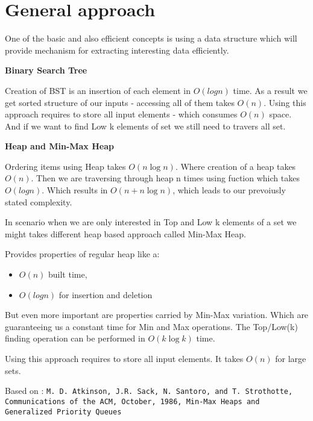 \section*{General approach}
One of the basic and also efficient concepts is using a data structure which
will provide mechanism for extracting interesting data efficiently. 

\noindent \textbf{Binary Search Tree}

Creation of BST is an insertion of each element in $O(log{}n)$ time. As a result 
we get sorted structure of our inputs - accessing all of them takes $O(n)$.
Using this approach requires to store all input elements - which consumes $O(n)$ space. 
And if we want to find Low k elements of set we still need to travers all set.

\noindent \textbf{Heap and Min-Max Heap}

Ordering items using Heap takes $O(n\log{}n)$. Where creation of a heap takes
$O(n)$. Then we are traversing through heap n times using fuction which takes
$O(log{}n)$. Which results in $O(n + n\log{}n)$, which leads to our prevoiusly
stated complexity.

In scenario when we are only interested in Top and Low k elements of a set we might takes
different heap based approach called Min-Max Heap.

Provides properties of regular heap like a: 
\begin{itemize}
\item $O(n)$ built time,
\item $O(log{}n)$ for insertion and deletion
\end{itemize}

But even more important are properties carried by Min-Max variation. Which are 
guaranteeing us a constant time for Min and Max operations. The Top/Low(k) 
finding operation can be performed in $O(k\log{}k)$ time.

Using this approach requires to store all input elements. It takes $O(n)$ for 
large sets.

Based on : \texttt{M. D. Atkinson, J.R. Sack, N. Santoro, and T. Strothotte, 
Communications of the ACM, 
October, 1986, 
Min-Max Heaps and Generalized Priority Queues}